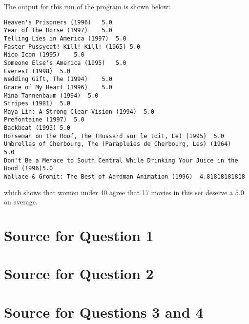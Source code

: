 \documentclass[letterpaper,11pt]{article}
\begin{document}
The output for this run of the program is shown below:
\begin{lstlisting}[frame=single]
Heaven's Prisoners (1996)	5.0
Year of the Horse (1997)	5.0
Telling Lies in America (1997)	5.0
Faster Pussycat! Kill! Kill! (1965)	5.0
Nico Icon (1995)	5.0
Someone Else's America (1995)	5.0
Everest (1998)	5.0
Wedding Gift, The (1994)	5.0
Grace of My Heart (1996)	5.0
Mina Tannenbaum (1994)	5.0
Stripes (1981)	5.0
Maya Lin: A Strong Clear Vision (1994)	5.0
Prefontaine (1997)	5.0
Backbeat (1993)	5.0
Horseman on the Roof, The (Hussard sur le toit, Le) (1995)	5.0
Umbrellas of Cherbourg, The (Parapluies de Cherbourg, Les) (1964)	5.0
Don't Be a Menace to South Central While Drinking Your Juice in the Hood (1996)5.0
Wallace & Gromit: The Best of Aardman Animation (1996)	4.81818181818
\end{lstlisting}
which shows that women under 40 agree that 17 movies in this set deserve a $5.0$ on average.

\clearpage
\appendix
\section{Source for Question 1}



\clearpage
\appendix
\section{Source for Question 2}



\clearpage
\appendix
\section{Source for Questions 3 and 4}


\end{document}
